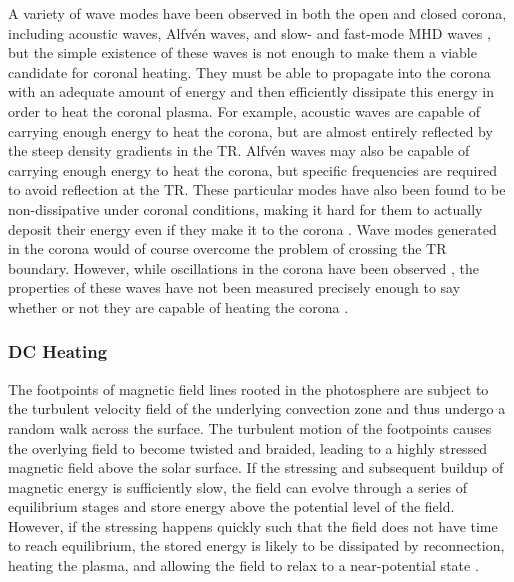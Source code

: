 A variety of wave modes have been observed in both the open and closed corona, including acoustic waves, Alfv\'{e}n waves, and slow- and fast-mode MHD waves \citep{aschwanden_physics_2006}, but the simple existence of these waves is not enough to make them a viable candidate for coronal heating. They must be able to propagate into the corona with an adequate amount of energy and then efficiently dissipate this energy in order to heat the coronal plasma. For example, acoustic waves are capable of carrying enough energy to heat the corona, but are almost entirely reflected by the steep density gradients in the TR. Alfv\'{e}n waves may also be capable of carrying enough energy to heat the corona, but specific frequencies are required to avoid reflection at the TR. These particular modes have also been found to be non-dissipative under coronal conditions, making it hard for them to actually deposit their energy even if they make it to the corona \citep{klimchuk_solving_2006}. Wave modes generated in the corona would of course overcome the problem of crossing the TR boundary. However, while oscillations in the corona have been observed \citep{de_moortel_longitudinal_2002,de_moortel_longitudinal_2002-1}, the properties of these waves have not been measured precisely enough to say whether or not they are capable of heating the corona \citep{klimchuk_solving_2006}.

\subsubsection{DC Heating}\label{sec:dc-heating}

The footpoints of magnetic field lines rooted in the photosphere are subject to the turbulent velocity field of the underlying convection zone and thus undergo a random walk across the surface. The turbulent motion of the footpoints causes the overlying field to become twisted and braided, leading to a highly stressed magnetic field above the solar surface. If the stressing and subsequent buildup of magnetic energy is sufficiently slow, the field can evolve through a series of equilibrium stages and store energy above the potential level of the field. However, if the stressing happens quickly such that the field does not have time to reach equilibrium, the stored energy is likely to be dissipated by reconnection, heating the plasma, and allowing the field to relax to a near-potential state \citep{priest_magnetohydrodynamics_2014}.

